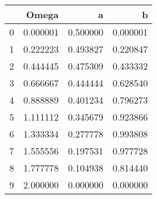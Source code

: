 \begin{tabular}{lrrr}
\toprule
{} &     Omega &         a &         b \\
\midrule
0 &  0.000001 &  0.500000 &  0.000001 \\
1 &  0.222223 &  0.493827 &  0.220847 \\
2 &  0.444445 &  0.475309 &  0.433332 \\
3 &  0.666667 &  0.444444 &  0.628540 \\
4 &  0.888889 &  0.401234 &  0.796273 \\
5 &  1.111112 &  0.345679 &  0.923866 \\
6 &  1.333334 &  0.277778 &  0.993808 \\
7 &  1.555556 &  0.197531 &  0.977728 \\
8 &  1.777778 &  0.104938 &  0.814440 \\
9 &  2.000000 &  0.000000 &  0.000000 \\
\bottomrule
\end{tabular}
